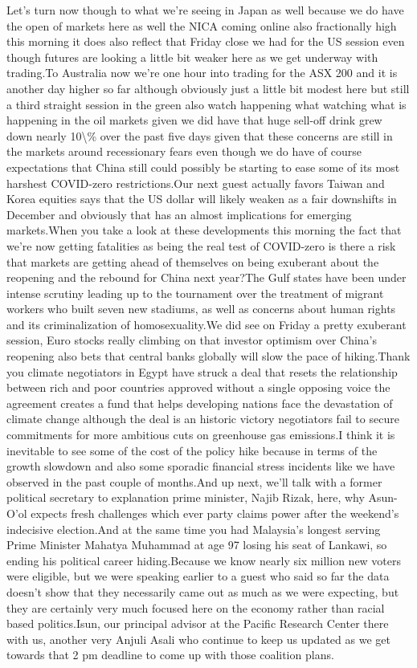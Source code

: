 \documentclass{article}%
\begin{document}
Let's turn now though to what we're seeing in Japan as well because we do have the open of markets here as well the NICA coming online also fractionally high this morning it does also reflect that Friday close we had for the US session even though futures are looking a little bit weaker here as we get underway with trading.To Australia now we're one hour into trading for the ASX 200 and it is another day higher so far although obviously just a little bit modest here but still a third straight session in the green also watch happening what watching what is happening in the oil markets given we did have that huge sell{-}off drink grew down nearly 10\textbackslash{}\% over the past five days given that these concerns are still in the markets around recessionary fears even though we do have of course expectations that China still could possibly be starting to ease some of its most harshest COVID{-}zero restrictions.Our next guest actually favors Taiwan and Korea equities says that the US dollar will likely weaken as a fair downshifts in December and obviously that has an almost implications for emerging markets.When you take a look at these developments this morning the fact that we're now getting fatalities as being the real test of COVID{-}zero is there a risk that markets are getting ahead of themselves on being exuberant about the reopening and the rebound for China next year?The Gulf states have been under intense scrutiny leading up to the tournament over the treatment of migrant workers who built seven new stadiums, as well as concerns about human rights and its criminalization of homosexuality.We did see on Friday a pretty exuberant session, Euro stocks really climbing on that investor optimism over China's reopening also bets that central banks globally will slow the pace of hiking.Thank you climate negotiators in Egypt have struck a deal that resets the relationship between rich and poor countries approved without a single opposing voice the agreement creates a fund that helps developing nations face the devastation of climate change although the deal is an historic victory negotiators fail to secure commitments for more ambitious cuts on greenhouse gas emissions.I think it is inevitable to see some of the cost of the policy hike because in terms of the growth slowdown and also some sporadic financial stress incidents like we have observed in the past couple of months.And up next, we'll talk with a former political secretary to explanation prime minister, Najib Rizak, here, why Asun{-}O'ol expects fresh challenges which ever party claims power after the weekend's indecisive election.And at the same time you had Malaysia's longest serving Prime Minister Mahatya Muhammad at age 97 losing his seat of Lankawi, so ending his political career hiding.Because we know nearly six million new voters were eligible, but we were speaking earlier to a guest who said so far the data doesn't show that they necessarily came out as much as we were expecting, but they are certainly very much focused here on the economy rather than racial based politics.Isun, our principal advisor at the Pacific Research Center there with us, another very Anjuli Asali who continue to keep us updated as we get towards that 2 pm deadline to come up with those coalition plans.%
\end{document}
